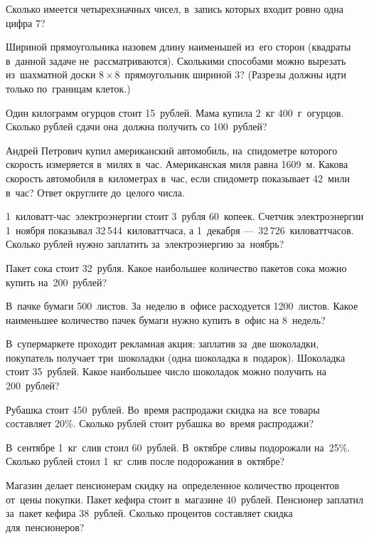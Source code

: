 Сколько имеется четырехзначных чисел, в~запись которых входит ровно одна цифра 7? 

Шириной прямоугольника назовем длину наименьшей из~его сторон (квадраты в~данной задаче не~рассматриваются). 
Сколькими способами можно вырезать из~шахматной доски $8 \times 8$~прямоугольник шириной 3? 
(Разрезы должны идти только по~границам клеток.) 

Один килограмм огурцов стоит 15~рублей. Мама купила 2~кг 400~г~огурцов. 
Сколько рублей сдачи она~должна получить со 100~рублей?

Андрей Петрович купил американский автомобиль, на~спидометре которого скорость измеряется в~милях в~час. 
Американская миля равна 1609~м. Какова скорость автомобиля в~километрах в~час, 
если спидометр показывает 42~мили в~час? Ответ округлите до~целого числа.

1~киловатт-час~электроэнергии стоит 3~рубля 60~копеек. Счетчик электроэнергии 1~ноября показывал 32\,544~киловаттчаса, 
а 1~декабря — 32\,726~киловаттчасов. Сколько рублей нужно заплатить за~электроэнергию за~ноябрь?

Пакет сока стоит 32~рубля. Какое наибольшее количество пакетов сока можно купить на~200~рублей?

В~пачке бумаги 500~листов. За~неделю в~офисе расходуется 1200~листов. 
Какое наименьшее количество пачек бумаги нужно купить в~офис на 8~недель?

В~супермаркете проходит рекламная акция: заплатив за~две шоколадки, покупатель получает три~шоколадки 
(одна шоколадка в~подарок). Шоколадка стоит 35~рублей. Какое наибольшее число шоколадок можно получить на 200~рублей?

Рубашка стоит 450~рублей. Во~время распродажи скидка на~все товары составляет 20\%. 
Сколько рублей стоит рубашка во~время распродажи?

В~сентябре 1~кг~слив стоил 60~рублей. В~октябре сливы подорожали на~25\%. 
Сколько рублей стоил 1~кг~слив после подорожания в~октябре?

Магазин делает пенсионерам скидку на~определенное количество процентов от~цены покупки. 
Пакет кефира стоит в~магазине 40~рублей. Пенсионер заплатил за~пакет кефира 38~рублей. 
Сколько процентов составляет скидка для~пенсионеров?

